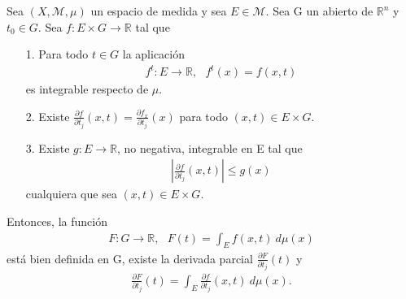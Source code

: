 \begin{teo}
    Sea $(X, \mathcal{M}, \mu)$ un espacio de medida y sea $E \in \mathcal{M}$. Sea G un abierto de $\mathbb{R}^n$ y $t_0 \in G$. Sea $f: E \times G \longrightarrow \mathbb{R}$ tal que
    \begin{enumerate}
        \item[1.] Para todo $t \in G$ la aplicación
              \begin{align*}
                  f^t: E \longrightarrow \mathbb{R}, \ \ \ f^t(x) = f(x,t)
              \end{align*}
              es integrable respecto de $\mu$.
        \item[2.] Existe $\frac{\partial  f}{\partial t_j}(x,t) = \frac{\partial f_x}{\partial t_j}(x)$ para todo $(x,t) \in E \times G$.
        \item[3.] Existe $g: E \longrightarrow \mathbb{R}$, no negativa, integrable en E tal que
              \begin{align*}
                  \left| \frac{\partial f}{\partial t_j}(x,t) \right| \leq g(x)
              \end{align*}
              cualquiera que sea $(x,t) \in E \times G$.
    \end{enumerate}
    Entonces, la función
    \begin{align*}
        F: G \longrightarrow \mathbb{R}, \ \ \ F(t) = \int_{E}{f(x,t) \ d\mu(x)}
    \end{align*}
    está bien definida en G, existe la derivada parcial $\frac{\partial F}{\partial t_j}(t)$ y
    \begin{align*}
        \frac{\partial F}{\partial t_j}(t) = \int_{E}{\frac{\partial f}{\partial t_j}(x,t) \ d\mu(x)}.
    \end{align*}
\end{teo}

